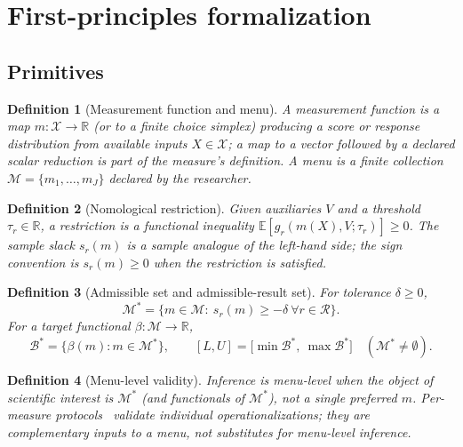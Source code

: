 \documentclass[10pt,letterpaper]{article}
\newtheorem{definition}{Definition}[section]
\newcommand{\M}{\ensuremath{\mathcal{M}}}
\newcommand{\E}{\mathbb{E}}
\newcommand{\Rset}{\mathcal{R}}
\newcommand{\Bset}{\mathcal{B}}
\begin{document}
\clearpage
\appendix

\section{First-principles formalization}
\label{app:formal}

\subsection{Primitives}
\begin{definition}[Measurement function and menu]
A \emph{measurement function} is a map $m:\mathcal{X}\to\mathbb{R}$ (or to a finite choice simplex) producing a score or response distribution from available inputs $X\in\mathcal{X}$; a map to a vector followed by a \emph{declared} scalar reduction is part of the measure's definition.
A \emph{menu} is a finite collection $\M=\{m_1,\ldots,m_J\}$ declared by the researcher.
\end{definition}

\begin{definition}[Nomological restriction]
Given auxiliaries $V$ and a threshold $\tau_r\in\mathbb{R}$, a \emph{restriction} is a functional inequality $\E[g_r(m(X),V;\tau_r)]\ge 0$.
The \emph{sample slack} $s_r(m)$ is a sample analogue of the left-hand side; the sign convention is $s_r(m)\ge 0$ when the restriction is satisfied.
\end{definition}

\begin{definition}[Admissible set and admissible-result set]
For tolerance $\delta\ge 0$,
\[
\M^*=\bigl\{m\in\M:\ s_r(m)\ge-\delta\ \forall r\in\Rset\bigr\}.
\]
For a target functional $\beta:\M\to\mathbb{R}$,
\[
\Bset^*=\bigl\{\beta(m):m\in\M^*\bigr\},\qquad
[L,U]=\bigl[\min\Bset^*,\ \max\Bset^*\bigr]\quad(\M^*\neq\emptyset).
\]
\end{definition}

\begin{definition}[Menu-level validity]
Inference is \emph{menu-level} when the object of scientific interest is $\M^*$ (and functionals of $\M^*$), not a single preferred $m$.
Per-measure protocols~\cite{proxy2026,halterman2026} validate individual operationalizations; they are complementary inputs to a menu, not substitutes for menu-level inference.
\end{definition}
\end{document}
